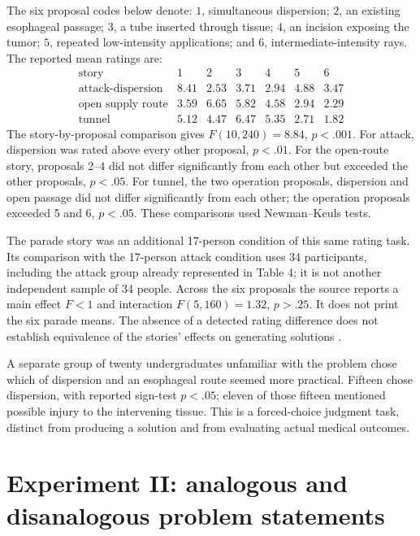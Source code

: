 The six proposal codes below denote:
\(1\), simultaneous dispersion;
\(2\), an existing esophageal passage;
\(3\), a tube inserted through tissue;
\(4\), an incision exposing the tumor;
\(5\), repeated low-intensity applications; and
\(6\), intermediate-intensity rays.
The reported mean ratings are:
\[
\begin{array}{l|rrrrrr}
 \text{story}&1&2&3&4&5&6\\ \hline
 \text{attack-dispersion}&8.41&2.53&3.71&2.94&4.88&3.47\\
 \text{open supply route}&3.59&6.65&5.82&4.58&2.94&2.29\\
 \text{tunnel}&5.12&4.47&6.47&5.35&2.71&1.82
\end{array}
\]
The story-by-proposal comparison gives
\(F(10,240)=8.84\), \(p<.001\).
For attack, dispersion was rated above every other
proposal, \(p<.01\). For the open-route story, proposals
2--4 did not differ significantly from each other
but exceeded the other proposals, \(p<.05\).
For tunnel, the two operation proposals, dispersion
and open passage did not differ significantly from
each other; the operation proposals exceeded 5 and 6,
\(p<.05\). These comparisons used Newman--Keuls tests.

The parade story was an additional 17-person condition
of this same rating task. Its comparison with the
17-person attack condition uses 34 participants,
including the attack group already represented in
Table 4; it is not another independent sample of
34 people. Across the six proposals the source reports
a main effect \(F<1\) and interaction
\(F(5,160)=1.32\), \(p>.25\). It does not print the
six parade means. The absence of a detected rating
difference does not establish equivalence of the
stories' effects on generating solutions
\cite[pp.~321--323, 333]{GickHolyoak1980AnalogicalProblemSolving}.

A separate group of twenty undergraduates unfamiliar
with the problem chose which of dispersion and an
esophageal route seemed more practical. Fifteen chose
dispersion, with reported sign-test \(p<.05\);
eleven of those fifteen mentioned possible injury
to the intervening tissue. This is a forced-choice
judgment task, distinct from producing a solution
and from evaluating actual medical outcomes.

\section{Experiment II: analogous and disanalogous problem statements}
\label{sec:p19-analogy-experiment-two}

